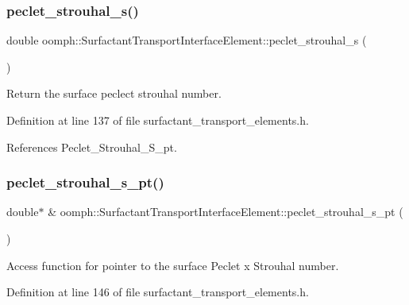 \subsubsection{\texorpdfstring{peclet\+\_\+strouhal\+\_\+s()}{peclet\_strouhal\_s()}}
{\footnotesize\ttfamily double oomph\+::\+Surfactant\+Transport\+Interface\+Element\+::peclet\+\_\+strouhal\+\_\+s (\begin{DoxyParamCaption}{ }\end{DoxyParamCaption})\hspace{0.3cm}{\ttfamily [inline]}}



Return the surface peclect strouhal number. 



Definition at line 137 of file surfactant\+\_\+transport\+\_\+elements.\+h.



References Peclet\+\_\+\+Strouhal\+\_\+\+S\+\_\+pt.

\mbox{\label{classoomph_1_1SurfactantTransportInterfaceElement_a422fa3f65ca6635b6bfbe993e01bce72}} 
\subsubsection{\texorpdfstring{peclet\+\_\+strouhal\+\_\+s\+\_\+pt()}{peclet\_strouhal\_s\_pt()}}
{\footnotesize\ttfamily double$\ast$ \& oomph\+::\+Surfactant\+Transport\+Interface\+Element\+::peclet\+\_\+strouhal\+\_\+s\+\_\+pt (\begin{DoxyParamCaption}{ }\end{DoxyParamCaption})\hspace{0.3cm}{\ttfamily [inline]}}



Access function for pointer to the surface Peclet x Strouhal number. 



Definition at line 146 of file surfactant\+\_\+transport\+\_\+elements.\+h.



